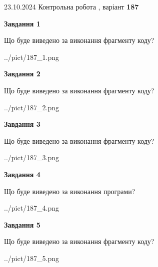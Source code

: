 \documentclass[12pt, ukrainian]{article}
\begin{document}
{\Large{23.10.2024 Контрольна робота , варіант  \No \textbf { 187 }\par}}
{
\begin {large}
{\begin {center}\textbf{Завдання 1}\end {center}}

Що буде виведено за виконання фрагменту коду?\par
\begin{center}
	{../pict/187_1.png}
\end{center}
\newpage

{\begin {center}\textbf{Завдання 2}\end {center}}

Що буде виведено за виконання фрагменту коду?\par
\begin{center}
	{../pict/187_2.png}
\end{center}
\newpage

{\begin {center}\textbf{Завдання 3}\end {center}}

Що буде виведено за виконання фрагменту коду?\par
\begin{center}
	{../pict/187_3.png}
\end{center}
\newpage

{\begin {center}\textbf{Завдання 4}\end {center}}

Що буде виведено за виконання програми?\par
\begin{center}
	{../pict/187_4.png}
\end{center}
\newpage

{\begin {center}\textbf{Завдання 5}\end {center}}

Що буде виведено за виконання фрагменту коду?\par
\begin{center}
	{../pict/187_5.png}
\end{center}
\newpage


\end{large}}
\end{document}
